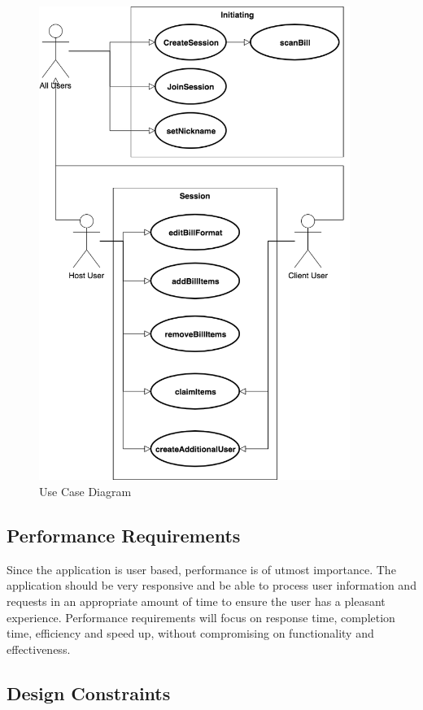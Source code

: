 \documentclass[12pt,a4paper]{article}
\begin{document}
			\begin{figure}[H]
			  \includegraphics[width=0.9\textwidth]{diagrams/usecase.png}
			   \vspace{0.1cm}
			    \caption{Use Case Diagram}
			    \label{Use Case Diagram}
			\end{figure}

	\subsection{Performance Requirements}
		Since the application is user based, performance is of utmost importance. The application should be very responsive and be able to process user information and requests in an appropriate amount of time to ensure the user has a pleasant experience. Performance requirements will focus on response time, completion time, efficiency and speed up, without compromising on functionality and effectiveness.
	\subsection{Design Constraints}
\end{document}
